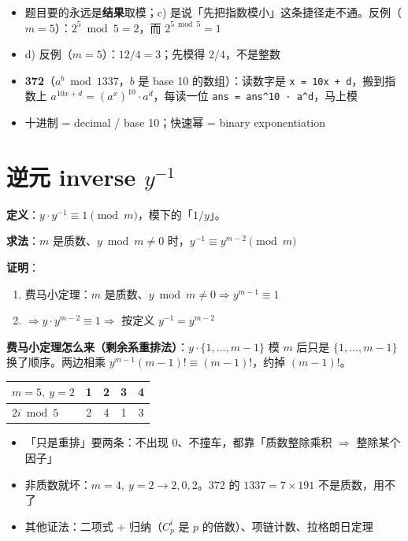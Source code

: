 \documentclass[10pt]{article}
\newcommand{\code}[1]{\texttt{\textcolor{codefg}{#1}}}
\begin{document}
\begin{itemize}
\item 题目要的永远是\textbf{结果}取模；c) 是说「先把指数模小」这条捷径走不通。反例（$m=5$）：$2^5 \bmod 5 = 2$，而 $2^{5 \bmod 5} = 1$
\item d) 反例（$m=5$）：$12/4 = 3$；先模得 $2/4$，不是整数
\item \textbf{372}（$a^b \bmod 1337$，$b$ 是 base 10 的数组）：读数字是 \code{x = 10x + d}，搬到指数上 $a^{10x+d} = (a^x)^{10} \cdot a^d$，每读一位 \code{ans = ans\^{}10 · a\^{}d}，马上模
\item 十进制 = decimal / base 10；快速幂 = binary exponentiation
\end{itemize}

\section{逆元 inverse $y^{-1}$}

\textbf{定义}：$y \cdot y^{-1} \equiv 1 \pmod m$，模下的「$1/y$」。

\textbf{求法}：$m$ 是质数、$y \bmod m \ne 0$ 时，$y^{-1} \equiv y^{m-2} \pmod m$

\textbf{证明}：
\begin{enumerate}
\item 费马小定理：$m$ 是质数、$y \bmod m \ne 0 \Rightarrow y^{m-1} \equiv 1$
\item $\Rightarrow y \cdot y^{m-2} \equiv 1 \Rightarrow$ 按定义 $y^{-1} = y^{m-2}$
\end{enumerate}

\textbf{费马小定理怎么来（剩余系重排法）}：$y \cdot \{1, \dots, m-1\}$ 模 $m$ 后只是 $\{1, \dots, m-1\}$ 换了顺序。两边相乘 $y^{m-1}(m-1)! \equiv (m-1)!$，约掉 $(m-1)!$。

\begin{center}
\begin{tabular}{@{}l cccc@{}}
\toprule
$m=5,\ y=2$ & 1 & 2 & 3 & 4\\
\midrule
$2i \bmod 5$ & 2 & 4 & 1 & 3\\
\bottomrule
\end{tabular}
\end{center}

\begin{itemize}
\item 「只是重排」要两条：不出现 0、不撞车，都靠「质数整除乘积 $\Rightarrow$ 整除某个因子」
\item 非质数就坏：$m=4,\ y=2 \to 2, 0, 2$。372 的 $1337 = 7 \times 191$ 不是质数，用不了
\item 其他证法：二项式 + 归纳（$C_p^i$ 是 $p$ 的倍数）、项链计数、拉格朗日定理
\end{itemize}
\end{document}
